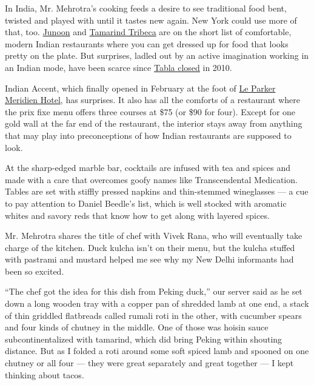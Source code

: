 In India, Mr. Mehrotra's cooking feeds a desire to see traditional food
bent, twisted and played with until it tastes new again. New York could
use more of that, too.
\href{http://www.nytimes3xbfgragh.onion/2011/03/30/dining/reviews/30rest.html?version=meter+at+0\&module=meter-Links\&pgtype=Blogs\&contentId=\&mediaId=\&referrer=http\%3A\%2F\%2Fquery.nytimes3xbfgragh.onion\%2Fsearch\%2Fsitesearch\%2F\%3Faction\%3Dclick\%26contentCollection\%26region\%3DTopBar\%26WT.nav\%3DsearchWidget\%26module\%3DSearchSubmit\%26pgtype\%3DHomepage\&priority=true\&action=click\&contentCollection=meter-links-click}{Junoon}
and
\href{http://www.nytimes3xbfgragh.onion/2010/08/04/dining/reviews/04rest.html}{Tamarind
Tribeca} are on the short list of comfortable, modern Indian restaurants
where you can get dressed up for food that looks pretty on the plate.
But surprises, ladled out by an active imagination working in an Indian
mode, have been scarce since
\href{http://dinersjournal.blogs.nytimes3xbfgragh.onion/2010/09/30/tabla-is-closing/}{Tabla
closed} in 2010.

Indian Accent, which finally opened in February at the foot of
\href{http://www.parkermeridien.com/home/}{Le Parker Meridien Hotel},
has surprises. It also has all the comforts of a restaurant where the
prix fixe menu offers three courses at \$75 (or \$90 for four). Except
for one gold wall at the far end of the restaurant, the interior stays
away from anything that may play into preconceptions of how Indian
restaurants are supposed to look.

At the sharp-edged marble bar, cocktails are infused with tea and spices
and made with a care that overcomes goofy names like Transcendental
Medication. Tables are set with stiffly pressed napkins and thin-stemmed
wineglasses --- a cue to pay attention to Daniel Beedle's list, which is
well stocked with aromatic whites and savory reds that know how to get
along with layered spices.

Mr. Mehrotra shares the title of chef with Vivek Rana, who will
eventually take charge of the kitchen. Duck kulcha isn't on their menu,
but the kulcha stuffed with pastrami and mustard helped me see why my
New Delhi informants had been so excited.

``The chef got the idea for this dish from Peking duck,'' our server
said as he set down a long wooden tray with a copper pan of shredded
lamb at one end, a stack of thin griddled flatbreads called rumali roti
in the other, with cucumber spears and four kinds of chutney in the
middle. One of those was hoisin sauce subcontinentalized with tamarind,
which did bring Peking within shouting distance. But as I folded a roti
around some soft spiced lamb and spooned on one chutney or all four ---
they were great separately and great together --- I kept thinking about
tacos.

